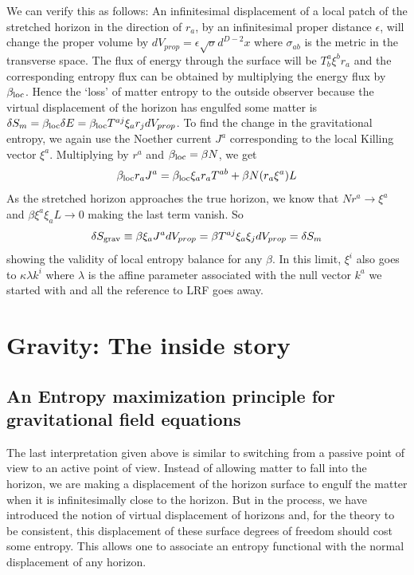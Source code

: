 \documentclass[12pt]{iopart}
\begin{document}
 We can verify this as follows:
An infinitesimal displacement of a local patch of the stretched horizon in the direction of $r_a$, by an infinitesimal proper distance $\epsilon$, will change the proper volume by $dV_{prop}=\epsilon\sqrt{\sigma}d^{D-2}x$ where $\sigma_{ab}$ is the metric in the transverse space.
 The flux of energy through the surface will be  $T^a_b \xi^b r_a$ and the corresponding  entropy flux
 can be obtained by multiplying the energy flux by $\beta_{\rm loc}$.  Hence
 the `loss' of matter entropy to the outside observer because the virtual displacement of the horizon has engulfed some matter is 
$\delta S_m=\beta_{\rm loc}\delta E=\beta_{\rm loc} T^{aj}\xi_a r_j dV_{prop}$. 
To find the change in the gravitational entropy, we again use the Noether current $J^a$ corresponding
to the local Killing vector $\xi^a$. 
Multiplying by $r^a$ and 
 $\beta_{\rm loc} = \beta N$, we get
\begin{equation}
\beta_{\rm loc} r_a J^a  = \beta_{\rm loc}\xi_a r_a T^{ab}  + \beta N ( r_a \xi^a) L
\end{equation}  
As the stretched horizon approaches the true horizon, we know that  $N r^a \to \xi^a$
 and $\beta \xi^a \xi_a L \to 0$ making the last term vanish. So
\begin{equation}
\delta S_{\rm grav} \equiv  \beta \xi_a J^a dV_{prop} = \beta T^{aj}\xi_a \xi_j dV_{prop}
=\delta S_m
\end{equation} 
showing the validity of local entropy balance for any $\beta$. 
In this limit, $\xi^i$ also goes to $\kappa \lambda k^i$ where $\lambda $ is the affine parameter associated with the null vector $k^a$ we started with  and all the reference to LRF goes away. 
 
 
 \section{Gravity: The inside story}\label{sec:gravitystory}
 
 \subsection{An Entropy maximization principle for gravitational field equations}
 
 The last interpretation given above is similar to switching from a passive point of view to an active point of view. 
 Instead of allowing matter to fall into the horizon, we are making a  displacement of the horizon surface to engulf the matter when it is infinitesimally close to the horizon. But in the process, we have introduced the notion of virtual displacement of horizons and, for the theory to be consistent, this displacement
of these surface degrees of freedom should cost  some entropy. 
This allows one to associate an entropy functional with the normal displacement of any horizon. 
\end{document}

